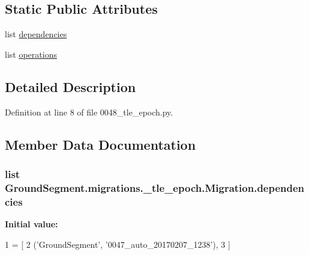 \subsection*{Static Public Attributes}
\begin{DoxyCompactItemize}
\item 
list \hyperlink{class_ground_segment_1_1migrations_1_10048__tle__epoch_1_1_migration_af01a527a2333e1d77a3950e635a85dd1}{dependencies}
\item 
list \hyperlink{class_ground_segment_1_1migrations_1_10048__tle__epoch_1_1_migration_a63c8dd3b77aa91a92f33c29709e4d0d1}{operations}
\end{DoxyCompactItemize}


\subsection{Detailed Description}


Definition at line 8 of file 0048\+\_\+tle\+\_\+epoch.\+py.



\subsection{Member Data Documentation}
\hypertarget{class_ground_segment_1_1migrations_1_10048__tle__epoch_1_1_migration_af01a527a2333e1d77a3950e635a85dd1}{}
\subsubsection[{dependencies}]{\setlength{\rightskip}{0pt plus 5cm}list Ground\+Segment.\+migrations.\+\_\+tle\+\_\+epoch.\+Migration.\+dependencies\hspace{0.3cm}{\ttfamily [static]}}\label{class_ground_segment_1_1migrations_1_10048__tle__epoch_1_1_migration_af01a527a2333e1d77a3950e635a85dd1}
{\bfseries Initial value\+:}
\begin{DoxyCode}
1 = [
2         (\textcolor{stringliteral}{'GroundSegment'}, \textcolor{stringliteral}{'0047\_auto\_20170207\_1238'}),
3     ]
\end{DoxyCode}


